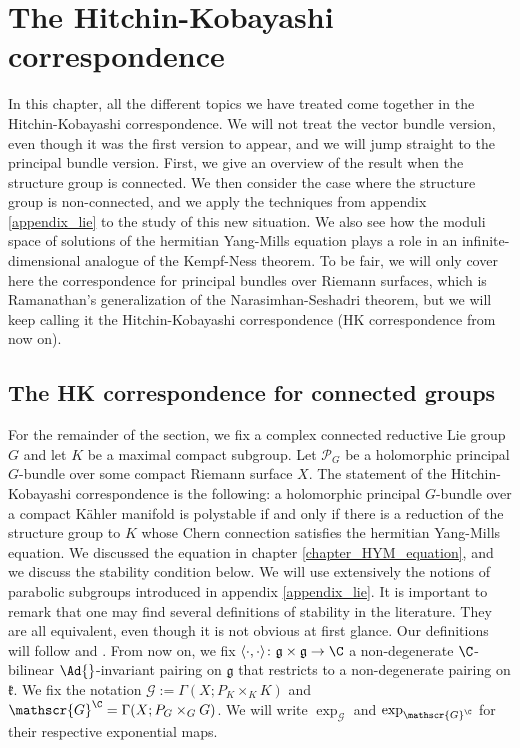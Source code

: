 \chapter{The Hitchin-Kobayashi correspondence} \label{chapter_HK_correspondence}
In this chapter, all the different topics we have treated come together in the Hitchin-Kobayashi correspondence. We will not treat the vector bundle version, even though it was the first version to appear, and we will jump straight to the principal bundle version. First, we give an overview of the result when the structure group is connected. We then consider the case where the structure group is non-connected, and we apply the techniques from appendix \ref{appendix_lie} to the study of this new situation. We also see how the moduli space of solutions of the hermitian Yang-Mills equation plays a role in an infinite-dimensional analogue of the Kempf-Ness theorem. To be fair, we will only cover here the correspondence for principal bundles over Riemann surfaces, which is Ramanathan's generalization of the Narasimhan-Seshadri theorem, but we will keep calling it the Hitchin-Kobayashi correspondence (HK correspondence from now on).

\section{The HK correspondence for connected groups}
For the remainder of the section, we fix a complex connected reductive Lie group \(G\) and let \(K\) be a maximal compact subgroup. Let \(\mathcal{P}_G\) be a holomorphic principal \(G\)-bundle over some compact Riemann surface \(X\). The statement of the Hitchin-Kobayashi correspondence is the following: a holomorphic principal \(G\)-bundle over a compact Kähler manifold is polystable if and only if there is a reduction of the structure group to \(K\) whose Chern connection satisfies the hermitian Yang-Mills equation. We discussed the equation in chapter \ref{chapter_HYM_equation}, and we discuss the stability condition below. We will use extensively the notions of parabolic subgroups introduced in appendix \ref{appendix_lie}. It is important to remark that one may find several definitions of stability in the literature. They are all equivalent, even though it is not obvious at first glance. Our definitions will follow \parencite{i1999hitchin} and \parencite{garcia2009hitchin}. From now on, we fix \(\langle \cdot, \cdot \rangle\colon \mathfrak{g} \times \mathfrak{g} \to \C\) a non-degenerate \(\C\)-bilinear \(\Ad{}\)-invariant pairing on \(\mathfrak{g}\) that restricts to a non-degenerate pairing on \(\mathfrak{k}\). We fix the notation \(\mathscr{G}:=\Gamma(X; P_K \times_K K)\) and \(\mathscr{G}^\C=\Gamma(X; P_G \times_G G)\). We will write \(\exp_{\mathscr{G}}\) and \(\exp_{\mathscr{G}^\C}\) for their respective exponential maps. 

